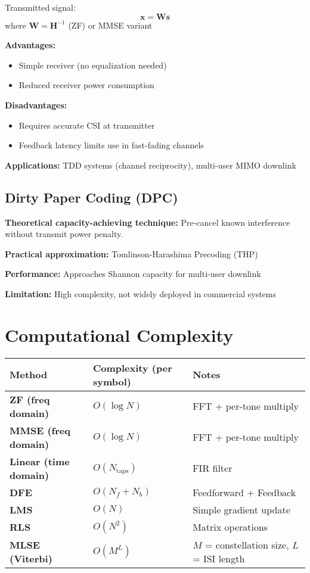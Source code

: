 Transmitted signal:
\begin{equation}
\mathbf{x} = \mathbf{W} \mathbf{s}
\label{eq:precoding}
\end{equation}
where $\mathbf{W} = \mathbf{H}^{-1}$ (ZF) or MMSE variant

\textbf{Advantages:}
\begin{itemize}
\item Simple receiver (no equalization needed)
\item Reduced receiver power consumption
\end{itemize}

\textbf{Disadvantages:}
\begin{itemize}
\item Requires accurate CSI at transmitter
\item Feedback latency limits use in fast-fading channels
\end{itemize}

\textbf{Applications:} TDD systems (channel reciprocity), multi-user MIMO downlink

\subsection{Dirty Paper Coding (DPC)}

\textbf{Theoretical capacity-achieving technique:} Pre-cancel known interference without transmit power penalty.

\textbf{Practical approximation:} Tomlinson-Harashima Precoding (THP)

\textbf{Performance:} Approaches Shannon capacity for multi-user downlink

\textbf{Limitation:} High complexity, not widely deployed in commercial systems

\section{Computational Complexity}
\label{sec:complexity}

\begin{center}
\begin{tabular}{@{}lll@{}}
\toprule
Method & Complexity (per symbol) & Notes \\
\midrule
\textbf{ZF (freq domain)} & $O(\log N)$ & FFT + per-tone multiply \\
\textbf{MMSE (freq domain)} & $O(\log N)$ & FFT + per-tone multiply \\
\textbf{Linear (time domain)} & $O(N_{\text{taps}})$ & FIR filter \\
\textbf{DFE} & $O(N_f + N_b)$ & Feedforward + Feedback \\
\textbf{LMS} & $O(N)$ & Simple gradient update \\
\textbf{RLS} & $O(N^2)$ & Matrix operations \\
\textbf{MLSE (Viterbi)} & $O(M^L)$ & $M$ = constellation size, $L$ = ISI length \\
\bottomrule
\end{tabular}
\end{center}

